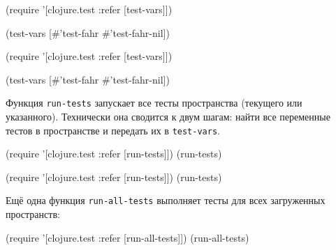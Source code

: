 \ifx\DEVICETYPE\MOBILE

\begin{english}
  \begin{clojure}
(require
  '[clojure.test :refer [test-vars]])

(test-vars
  [#'test-fahr #'test-fahr-nil])
  \end{clojure}
\end{english}

\else

\begin{english}
  \begin{clojure}
(require '[clojure.test :refer [test-vars]])

(test-vars [#'test-fahr #'test-fahr-nil])
  \end{clojure}
\end{english}

\fi


Функция \verb|run-tests| запускает все тесты пространства (текущего или
указанного). Технически она сводится к двум шагам: найти все переменные тестов в
пространстве и передать их в \verb|test-vars|.

\ifx\DEVICETYPE\MOBILE

\begin{english}
  \begin{clojure}
(require
  '[clojure.test :refer [run-tests]])
(run-tests)
  \end{clojure}
\end{english}

\else

\begin{english}
  \begin{clojure}
(require '[clojure.test :refer [run-tests]])
(run-tests)
  \end{clojure}
\end{english}

\fi

Ещё одна функция \verb|run-all-tests| выполняет тесты для всех загруженных
пространств:

\ifx\DEVICETYPE\MOBILE

\begin{english}
  \begin{clojure}
(require
  '[clojure.test :refer [run-all-tests]])
(run-all-tests)
  \end{clojure}
\end{english}

\else

